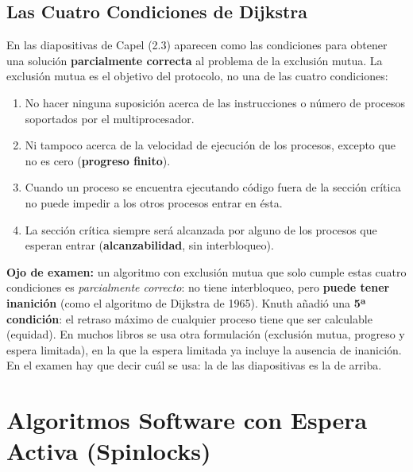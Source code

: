 \subsection{Las Cuatro Condiciones de Dijkstra}
En las diapositivas de Capel (2.3) aparecen como las condiciones para obtener una solución \textbf{parcialmente correcta} al problema de la exclusión mutua. La exclusión mutua es el objetivo del protocolo, no una de las cuatro condiciones:

\begin{definicion}
\begin{enumerate}[leftmargin=*]
    \item No hacer ninguna suposición acerca de las instrucciones o número de procesos soportados por el multiprocesador.
    \item Ni tampoco acerca de la velocidad de ejecución de los procesos, excepto que no es cero (\textbf{progreso finito}).
    \item Cuando un proceso se encuentra ejecutando código fuera de la sección crítica no puede impedir a los otros procesos entrar en ésta.
    \item La sección crítica siempre será alcanzada por alguno de los procesos que esperan entrar (\textbf{alcanzabilidad}, sin interbloqueo).
\end{enumerate}
\end{definicion}

\textbf{Ojo de examen:} un algoritmo con exclusión mutua que solo cumple estas cuatro condiciones es \emph{parcialmente correcto}: no tiene interbloqueo, pero \textbf{puede tener inanición} (como el algoritmo de Dijkstra de 1965). Knuth añadió una \textbf{5ª condición}: el retraso máximo de cualquier proceso tiene que ser calculable (equidad). En muchos libros se usa otra formulación (exclusión mutua, progreso y espera limitada), en la que la espera limitada ya incluye la ausencia de inanición. En el examen hay que decir cuál se usa: la de las diapositivas es la de arriba.

\section{Algoritmos Software con Espera Activa (Spinlocks)}

